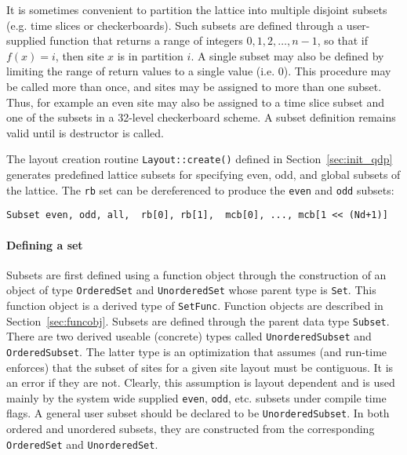 \documentclass[12pt,letterpaper]{article}
\begin{document}
It is sometimes convenient to partition the lattice into multiple
disjoint subsets (e.g. time slices or checkerboards).  Such subsets
are defined through a user-supplied function that returns a range of
integers $0,1,2,\ldots{},n-1$, so that if $f(x) = i$, then site $x$ is
in partition $i$.  A single subset may also be defined by limiting the
range of return values to a single value (i.e. 0).  This procedure may
be called more than once, and sites may be assigned to more than one
subset.  Thus, for example an even site may also be assigned to a time
slice subset and one of the subsets in a 32-level checkerboard scheme.
A subset definition remains valid until is destructor is called.

The layout creation routine \verb|Layout::create()| defined in
Section~\ref{sec:init_qdp} generates predefined lattice subsets for
specifying even, odd, and global subsets of the lattice. The \verb|rb|
set can be dereferenced to produce the \verb|even| and \verb|odd| subsets:
%
\begin{verbatim}
Subset even, odd, all,  rb[0], rb[1],  mcb[0], ..., mcb[1 << (Nd+1)]
\end{verbatim}
%

\paragraph{Defining a set}

Subsets are first defined using a function object through the
construction of an object of type \verb|OrderedSet| and
\verb|UnorderedSet| whose parent type is \verb|Set|. This function
object is a derived type of \verb|SetFunc|. Function objects are
described in Section~\ref{sec:funcobj}. Subsets are defined through
the parent data type \verb|Subset|. There are two derived useable
(concrete) types called \verb|UnorderedSubset| and
\verb|OrderedSubset|. The latter type is an optimization that assumes
(and run-time enforces) that the subset of sites for a given site
layout must be contiguous. It is an error if they are not. Clearly,
this assumption is layout dependent and is used mainly by the system
wide supplied \verb|even|, \verb|odd|, etc. subsets under compile time
flags. A general user subset should be declared to be
\verb|UnorderedSubset|. In both ordered and unordered subsets, they
are constructed from the corresponding \verb|OrderedSet| and
\verb|UnorderedSet|.
\end{document}
